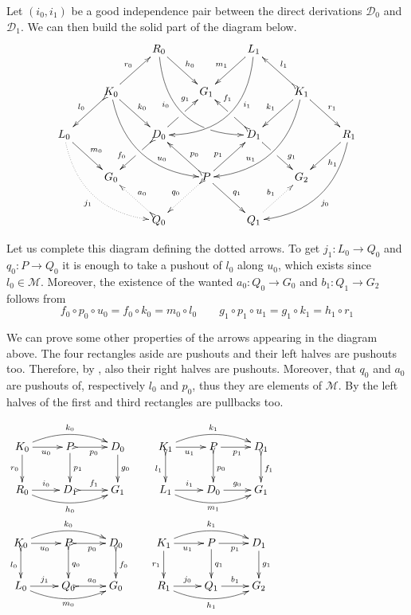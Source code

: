 \documentclass[a4paper,UKenglish,cleveref,pdftex, thm-restate,numberwithinsect]{lipics}
\newcommand{\dder}[1]{\mathscr{#1}}
\begin{document}
\begin{remark}\label{rem:deco} Let $(i_0, i_1)$ be a good independence pair between the direct derivations $\dder{D}_0$ and $\dder{D}_1$. We can then build the solid part of the diagram below.
	\[\xymatrix{&&R_0 \ar@/_1cm/[ddrr]_(.35){i_0}|(.7)\hole  \ar[dr]^{h_0}&& L_1\ar@/^1cm/[ddll]^(.35){i_1}  \ar[dl]_{m_1}\\&K_0\ar[dr]^{k_0}\ar@{>->}[dl]_{l_0} \ar@/_.8cm/[ddrr]^(.65){u_0}\ar[ur]^{r_0}&& G_1 && K_1 \ar@/^.8cm/[ddll]_(.65){u_1}\ar[dl]_{k_1}\ar@{>->}[lu]_{l_1} \ar[dr]^{r_1}\\L_0 \ar[dr]^{m_0} \ar@{.>}@/_.8cm/[ddrr]_{j_1}&& D_0 \ar@{>->}[dl]|(.42)\hole_(.64){f_0}\ar[ur]|(.48)\hole^(.7){g_1}&&D_1 \ar[dr]|(.42)\hole^(.65){g_1} \ar@{>->}[ul]|(.48)\hole_(.7){f_1}&&R_1\ar@/^.8cm/[ddll]^{j_0}\ar[dl]^{h_1}\\&G_0 &&P\ar[dr]^{q_1} \ar@{>.>}[dl]_{q_0}\ar[ur]^(.4){p_1}\ar@{>->}[ul]_(.4){p_0}&&G_2\\&&Q_0 \ar@{>->}@{>.>}[ul]_{a_0} &&Q_1\ar@{.>}[ur]^{b_1}}\]
	
	Let us complete this diagram defining the dotted arrows. To get $j_1\colon L_0\to Q_0$ and $q_0\colon P\to Q_0$ it is enough to take a pushout of $l_0$ along $u_0$, which exists since $l_0\in \mathcal{M}$. Moreover, the existence of the wanted $a_0\colon Q_0\to G_0$ and $b_1\colon Q_1\to G_2$ follows from
	\[
	f_0\circ p_0 \circ u_0 = f_0\circ k_0 = m_0\circ l_0 \qquad  
	g_1\circ p_1\circ u_1 = g_1\circ k_1=h_1\circ r_1\]
	
	\noindent
	\parbox{5.5cm}{\hspace{15pt}We can prove some other properties of the arrows appearing in the diagram above. The four rectangles aside are pushouts and their left halves are pushouts too. Therefore, by , also their right halves are pushouts. 	Moreover, that $q_0$ and $a_0$ are pushouts of, respectively $l_0$ and $p_0$, thus they  are elements of $\mathcal{M}$. By  the left halves of the first and third rectangles are pullbacks too.} 
	\parbox{3.5cm}{
	$\xymatrix{K_0 \ar@/^.4cm/[rr]^{k_0}\ar[d]_{r_0}\ar[r]_{u_0} &P\ar[d]^{p_1} \ar@{>->}[r]_{p_0} & D_0 \ar[d]^{g_0}&K_1 \ar@/^.4cm/[rr]^{k_1}\ar@{>->}[d]_{l_1}\ar[r]_{u_1} &P\ar@{>->}[d]^{p_0} \ar[r]_{p_1} & D_1 \ar@{>->}[d]^{f_1}\\  R_0 \ar@/_.4cm/[rr]_{h_0} \ar[r]^{i_0}&D_1 \ar@{>->}[r]^{f_1} & G_1&L_1 \ar@/_.4cm/[rr]_{m_1} \ar[r]^{i_1}&D_0\ar[r]^{g_0} & G_1}$
		$\xymatrix{K_0 \ar@/^.4cm/[rr]^{k_0}\ar@{>->}[d]_{l_0}\ar[r]_{u_0} &P\ar@{>->}[d]^{q_0} \ar@{>->}[r]_{p_0} & D_0 \ar@{>->}[d]^{f_0}&K_1 \ar@/^.4cm/[rr]^{k_1}\ar[d]_{r_1}\ar[r]_{u_1} &P\ar[d]^{q_1} \ar[r]_{p_1} & D_1 \ar[d]^{g_1}\\ L_0 \ar@/_.4cm/[rr]_{m_0} \ar[r]^{j_1}&Q_0 \ar@{>->}[r]^{a_0} & G_0&R_1 \ar@/_.4cm/[rr]_{h_1} \ar[r]^{j_0}&Q_1 \ar[r]^{b_1} & G_2}$}
\end{remark}
\end{document}

